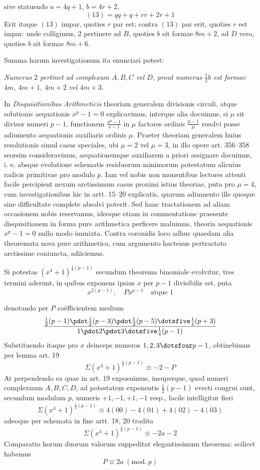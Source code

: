 %
sive statuendo $a=4q+1$, $b=4r+2$,
\[
(13)=qq+q+rr+2r+1
\]
Erit itaque $(13)$ impar, quoties $r$ par est; contra $(13)$ par erit, quoties $r$ est impar: unde colligimus, $2$ pertinere ad $B$, quoties $b$ sit formae $8m+2$, ad $D$ vero, quoties $b$ sit formae $8m+6$.

Summa harum investigationum ita enunciari potest:

\emph{Numerus $2$ pertinet ad complexum $A,B,C$ vel $D$, prout numerus $\frac12b$ est formae $4m$, $4m+1$, $4m+2$ vel $4m+3$.}

In \emph{Disquisitionibus Arithmeticis} theoriam generalem divisionis circuli, atque solutionis aequationis $x^p-1=0$ explicavimus, interque alia docuimus, si $\mu$ sit divisor numeri $p-1$, functionem $\frac{x^p-1}{x-1}$ in $\mu$ factores ordinis $\frac{p-1}{\mu}$ resolvi posse adiumento aequationis auxiliaris ordinis $\mu$. Praeter theoriam generalem huius resolutionis simul casus speciales, ubi $\mu=2$ vel $\mu=3$, in illo opere art. 356--358 seorsim consideravimus, aequationemque auxiliarem a priori assignare docuimus, i. e. absque evolutione schematis residuorum minimorum potestatum alicuius radicis primitivae pro modulo $p$. Iam vel nobis non monentibus lectores attenti facile percipient nexum arctissimum casus proximi istius theoriae, puta pro $\mu=4$, cum investigationibus hic in artt. 15--20 explicatis, quarum adiumento ille quoque sine difficultate complete absolvi poterit. Sed hanc tractationem ad aliam occasionem nobis reservamus, ideoque etiam in commentatione praesente disquisitionem in forma pure arithmetica perficere maluimus, theoria aequationis $x^p-1=0$ nullo modo immixta. Contra coronidis loco adhuc quaedam alia theoremata nova pure arithmetica, cum argumento hactenus pertractato arctissime coniuncta, adiiciemus.

Si potestas $(x^4+1)^{\frac12(p-1)}$ secundum theorema binomiale evolvitur, tres termini aderunt, in quibus exponens ipsius $x$ per $p-1$ divisibilis est, puta
\[
x^{2(p-1)},\quad Px^{p-1}\quad\text{atque }1
\]

%
denotando per $P$ coëfficientem medium
\[
\frac{\frac12(p-1)\pdot\frac12(p-3)\pdot\frac12(p-5)\dotsfive\frac14(p+3)}{1\pdot2\pdot3\dotsfive\frac14(p-1)}
\]
Substituendo itaque pro $x$ deinceps numeros $1,2,3\dotsfour p-1$, obtinebimus per lemma art. 19
\[
\Sigma(x^4+1)^{\frac12(p-1)}\equiv-2-P
\]
At perpendendo ea quae in art. 19 exposuimus, insuperque, quod numeri complexuum $A,B,C,D$, ad potestatem exponentis $\frac12(p-1)$ evecti congrui sunt, secundum modulum $p$, numeris $+1,-1,+1,-1$ resp., facile intelligitur fieri
\[
\Sigma(x^4+1)^{\frac12(p-1)}\equiv4(00)-4(01)+4(02)-4(03)
\]
adeoque per schemata in fine artt. 18, 20 tradita
\[
\Sigma(x^4+1)^{\frac12(p-1)}\equiv-2a-2
\]
Comparatio horum duorum valorum suppeditat elegantissimum theorema: scilicet habemus
\[
P\equiv2a\ (\mathrm{mod.}\ p)
\]

